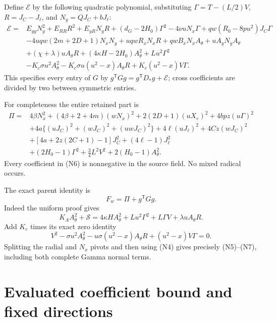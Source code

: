 \documentclass[11pt]{article}
\begin{document}
Define $\mathcal E$ by the following quadratic polynomial, substituting
$\Gamma=T-(L/2)V$, $R=J_C-J_\ell$, and $N_y=QJ_C+bJ_\ell$:
\[
\begin{split}
 \mathcal E={}&E_{yy}N_y^2+E_{RR}R^2+E_{yR}N_yR
 +(d_G-2H_0)\Gamma^2-4\nu uN_x\Gamma
 +qw(R_0-8pu^2)J_C\Gamma\\
 &-4uqw(2m+2D+1)N_xN_y+uqwR_xN_xR
 +qwB_xN_xA_\theta+uA_yN_yA_\theta\\
 &+(\chi+\lambda)uA_\theta R
 +(4\kappa H-2H_0)A_\theta^2+Lu^2\Gamma^2\\
 &-K_c\sigma u^2 A_\theta^2
 -K_c\sigma u(u^2-x)A_\theta R
 +K_c(u^2-x)V\Gamma .
\end{split}                                                    \tag{N5}
\]
This specifies every entry of $G$ by
$g^{\mathsf T}Gg=g^{\mathsf T}D_*g+\mathcal E$; cross coefficients
are divided by two between symmetric entries.

For completeness the entire retained part is
\[
\begin{split}
 \Pi={}&4\beta N_x^2+(4\beta+2+4m)(wN_x)^2
 +2(2D+1)(uX_e)^2+4bpz(u\Gamma)^2\\
 &+4a\{(uJ_C)^2+(wJ_C)^2+(uwJ_C)^2\}
 +4\ell(uJ_\ell)^2+4Cz(wJ_C)^2\\
 &+[4a+2z(2C+1)-1]J_C^2+(4\ell-1)J_\ell^2\\
 &+(2H_0-1)\Gamma^2+\tfrac34L^2V^2
 +2(H_0-1)A_\theta^2.
\end{split}                                                    \tag{N6}
\]
Every coefficient in (N6) is nonnegative in the source field.
No mixed radical occurs.

The exact parent identity is
\[
                     F_w=\Pi+g^{\mathsf T}Gg.             \tag{N7}
\]
Indeed the uniform proof gives
\[
 K_AA_\theta^2+\mathscr S
 =4\kappa H A_\theta^2+Lu^2\Gamma^2+L\Gamma V
                                      +\lambda uA_\theta R.
\]
Add $K_c$ times its exact zero identity
\[
 V^2-\sigma u^2A_\theta^2
 -u\sigma(u^2-x)A_\theta R+(u^2-x)V\Gamma=0.
\]
Splitting the radial and $N_x$ pivots and then using (N4) gives
precisely (N5)--(N7), including both complete Gamma normal terms.

\section{Evaluated coefficient bound and fixed directions}
\end{document}
